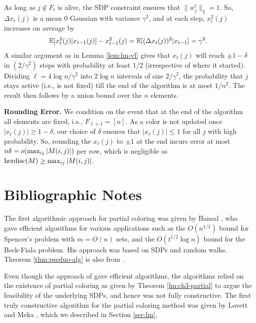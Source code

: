 \medskip
{}
As long as $j \not \in F_t$ is alive, the SDP constraint ensures that 
$\|w^t_j\|_2=1$. So, $\Delta x_t(j)$ is a mean $0$ Gaussian with variance $\gamma^2$, and at each step,
$x_{t}^2(j)$ increases  on average by \[\mathbb{E}[x_{t}^2(j)|x_{t-1}(j)] - x^2_{t-1}(j)  = \mathbb{E}[(\Delta x_t(j))^2|x_{t-1}] =\gamma^2.\] 
A similar argument as in Lemma \ref{lem:lm-vl} gives that $x_t(j)$ will reach $\pm 1-\delta$ in
$(2/\gamma^2)$ steps with probability at least $1/2$ (irrespective of where it started).
Dividing $\ell = 4\log n/\gamma^2$ into $2 \log n$ intervals of size $2/\gamma^2$, the probability that $j$ stays active (i.e., is not fixed) till the end of the algorithm is at most $1/n^2$. The result then follows by a union bound over the $n$ elements.

\medskip
\noindent
{\bf Rounding Error.}
We condition on the event that at the end of the algorithm all elements are fixed, i.e., $F_{\ell+1} = [n]$.
As a color is not updated once $|x_t(j)|\geq 1-\delta$, our choice of $\delta$ ensures that  $|x_\ell(j)| \leq 1$ for all $j$ with high probability.
So, rounding the $x_\ell(j)$ to $\pm 1$ at the end incurs error at most $n \delta =  o(\max_{ij}|M(i,j)|)$ per row, which is negligible as $\operatorname{herdisc}(M) \geq \max_{ij} |M(i,j)|$.




\section{Bibliographic Notes}
\label{sec:ch4-notes}
The first algorithmic approach for partial coloring was given by Bansal \cite{B10}, who gave efficient algorithms for various applications such as the $O(n^{1/2})$ bound for Spencer's problem with $m=O(n)$ sets, and the $O(t^{1/2} \log n)$ bound for the Beck-Fiala problem. His approach was based on SDPs and random walks. Theorem \ref{thm:pseduo-alg} is also from \cite{B10}. 

Even though the approach of \cite{B10} gave efficient algorithms, the algorithms relied on the existence of partial coloring as given by Theorem \ref{lm:ch3-partial} to argue the feasibility of the underlying SDPs, and hence was not fully constructive.
The first truly constructive algorithm for the partial coloring method was given by Lovett and Meka \cite{lovettmeka}, which we described in Section \ref{sec:lm},  

